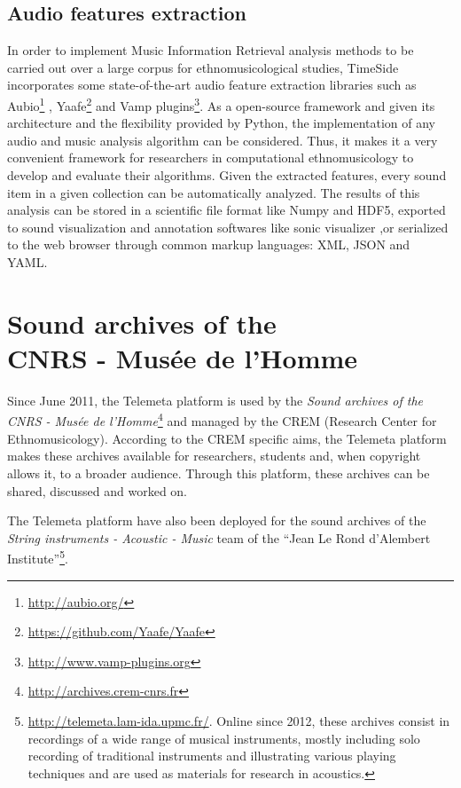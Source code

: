 \documentclass{sig-alternate}
\newcommand{\CREM}{Research Center for Ethnomusicology}
\begin{document}
\subsection{Audio features extraction}
In order to implement Music Information Retrieval analysis methods to be carried out over a large corpus for ethnomusicological studies, TimeSide incorporates some state-of-the-art audio feature extraction libraries such as Aubio\footnote{\url{http://aubio.org/}} \cite{brossierPhD}, Yaafe\footnote{\url{https://github.com/Yaafe/Yaafe}} \cite{yaafe_ISMIR2010} and Vamp plugins\footnote{ \url{http://www.vamp-plugins.org}}.
As a open-source framework and given its architecture and the flexibility provided by Python, the implementation of any audio and music analysis algorithm can be considered. Thus, it makes it a very convenient framework for researchers in computational ethnomusicology to develop and evaluate their algorithms.
Given the extracted features, every sound item in a given collection can be automatically analyzed. The results of this analysis can be stored in a scientific file format like Numpy and HDF5, exported to sound visualization and annotation softwares like sonic visualizer \cite{cannam2006sonic},or serialized to the web browser through common markup languages: XML, JSON and YAML.



\section{Sound archives of the \\CNRS - Musée de l'Homme}\label{sec:archives-CREM}
Since June 2011, the Telemeta platform is used by the  \emph{Sound archives of the CNRS - Musée de l'Homme}\footnote{\url{http://archives.crem-cnrs.fr}} and managed by the CREM (\CREM). According to the CREM specific aims, the Telemeta platform makes these archives available for researchers, students and, when copyright allows it, to a broader audience. Through this platform, these archives can be shared, discussed and worked on.

The Telemeta platform have also been deployed for the sound archives of the \emph{String instruments - Acoustic - Music} team of the ``Jean Le Rond d'Alembert Institute''\footnote{\url{http://telemeta.lam-ida.upmc.fr/}. Online since 2012, these archives consist in recordings of a wide range of musical instruments, mostly including solo recording of traditional instruments and illustrating various playing techniques and are used as materials for research in acoustics.}.
\end{document}
